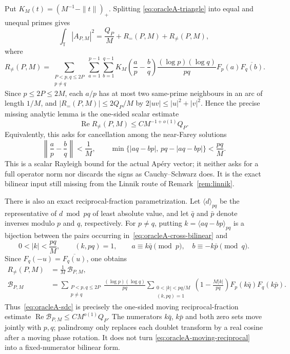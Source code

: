Put $K_M(t)=(M^{-1}-\|t\|)_+$.  Splitting
\eqref{eq:oracleA-triangle} into equal and unequal primes gives
\[
 \int_{\mathbb T}|A_{P,M}|^2
 =\frac{Q_P}{M}+R_{=}(P,M)+R_{\ne}(P,M),
\]
where
\begin{equation}
 R_{\ne}(P,M)=
 \sum_{\substack{P<p,q\leq2P\\p\ne q}}
 \sum_{a=1}^{p-1}\sum_{b=1}^{q-1}
 K_M\!\left(\frac ap-\frac bq\right)
 \frac{(\log p)(\log q)}{pq}
 F_p(a)\overline{F_q(b)}.
 \label{eq:oracleA-cross-bilinear}
\end{equation}
Since $p\leq2P\leq2M$, each $a/p$ has at most two same-prime neighbours
in an arc of length $1/M$, and $|R_{=}(P,M)|\leq2Q_P/M$ by
$2|uv|\leq|u|^2+|v|^2$.  Hence the precise missing analytic lemma is the
one-sided scalar estimate
\begin{equation}
 \operatorname{Re}R_{\ne}(P,M)\leq C M^{-1+o(1)}Q_P.
 \tag{SDC}\label{eq:oracleA-sdc}
\end{equation}
Equivalently, this asks for cancellation among the near-Farey solutions
\[
 \left\|\frac ap-\frac bq\right\|<\frac1M,
 \qquad
 \min\{|aq-bp|,\,pq-|aq-bp|\}<\frac{pq}{M}.
\]
This is a scalar Rayleigh bound for the actual Ap\'ery vector; it neither
asks for a full operator norm nor discards the signs as Cauchy--Schwarz
does.  It is the exact bilinear input still missing from the Linnik route
of Remark~\ref{rem:linnik}.

There is also an exact reciprocal-fraction parametrization.  Let
$\langle d\rangle_{pq}$ be the representative of $d\bmod pq$ of least
absolute value, and let $\bar q$ and $\bar p$ denote inverses modulo $p$
and $q$, respectively.  For $p\ne q$, putting
$k=\langle aq-bp\rangle_{pq}$ is a bijection between the pairs occurring
in~\eqref{eq:oracleA-cross-bilinear} and
\[
 0<|k|<\frac{pq}{M},\qquad (k,pq)=1,
 \qquad a\equiv k\bar q\pmod p,\quad
 b\equiv-k\bar p\pmod q.
\]
Since $F_q(-u)=\overline{F_q(u)}$, one obtains
\begin{align}
 R_{\ne}(P,M)&=\frac1M\,\mathcal B_{P,M},
 \label{eq:oracleA-reciprocal-form}\\
 \mathcal B_{P,M}
 &=\sum_{\substack{P<p,q\leq2P\\p\ne q}}
   \frac{(\log p)(\log q)}{pq}
   \sum_{\substack{0<|k|<pq/M\\(k,pq)=1}}
   \left(1-\frac{M|k|}{pq}\right)
   F_p(k\bar q)F_q(k\bar p).
 \label{eq:oracleA-moving-reciprocal}
\end{align}
Thus~\eqref{eq:oracleA-sdc} is precisely the one-sided moving
reciprocal-fraction estimate
$\operatorname{Re}\mathcal B_{P,M}\leq C M^{o(1)}Q_P$.
The numerators $k\bar q$, $k\bar p$ and both zero sets move jointly with
$p,q$; palindromy only replaces each doublet transform by a real cosine
after a moving phase rotation.  It does not turn
\eqref{eq:oracleA-moving-reciprocal} into a fixed-numerator bilinear form.

